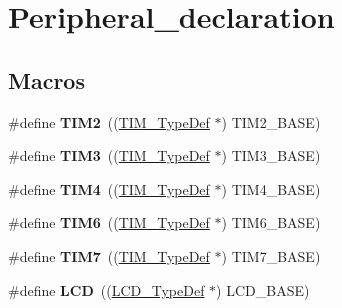 \hypertarget{group___peripheral__declaration}{\section{Peripheral\-\_\-declaration}
\label{group___peripheral__declaration}
}
\subsection*{Macros}
\begin{DoxyCompactItemize}
\item 
\hypertarget{group___peripheral__declaration_ga3cfac9f2e43673f790f8668d48b4b92b}{\#define {\bfseries T\-I\-M2}~((\hyperlink{struct_t_i_m___type_def}{T\-I\-M\-\_\-\-Type\-Def} $\ast$) T\-I\-M2\-\_\-\-B\-A\-S\-E)}\label{group___peripheral__declaration_ga3cfac9f2e43673f790f8668d48b4b92b}

\item 
\hypertarget{group___peripheral__declaration_ga61ee4c391385607d7af432b63905fcc9}{\#define {\bfseries T\-I\-M3}~((\hyperlink{struct_t_i_m___type_def}{T\-I\-M\-\_\-\-Type\-Def} $\ast$) T\-I\-M3\-\_\-\-B\-A\-S\-E)}\label{group___peripheral__declaration_ga61ee4c391385607d7af432b63905fcc9}

\item 
\hypertarget{group___peripheral__declaration_ga91a09bad8bdc7a1cb3d85cf49c94c8ec}{\#define {\bfseries T\-I\-M4}~((\hyperlink{struct_t_i_m___type_def}{T\-I\-M\-\_\-\-Type\-Def} $\ast$) T\-I\-M4\-\_\-\-B\-A\-S\-E)}\label{group___peripheral__declaration_ga91a09bad8bdc7a1cb3d85cf49c94c8ec}

\item 
\hypertarget{group___peripheral__declaration_gac7b4ed55f9201b498b38c962cca97314}{\#define {\bfseries T\-I\-M6}~((\hyperlink{struct_t_i_m___type_def}{T\-I\-M\-\_\-\-Type\-Def} $\ast$) T\-I\-M6\-\_\-\-B\-A\-S\-E)}\label{group___peripheral__declaration_gac7b4ed55f9201b498b38c962cca97314}

\item 
\hypertarget{group___peripheral__declaration_ga49267c49946fd61db6af8b49bcf16394}{\#define {\bfseries T\-I\-M7}~((\hyperlink{struct_t_i_m___type_def}{T\-I\-M\-\_\-\-Type\-Def} $\ast$) T\-I\-M7\-\_\-\-B\-A\-S\-E)}\label{group___peripheral__declaration_ga49267c49946fd61db6af8b49bcf16394}

\item 
\hypertarget{group___peripheral__declaration_gabf2d80992dcfabfd1668184c3dff2733}{\#define {\bfseries L\-C\-D}~((\hyperlink{struct_l_c_d___type_def}{L\-C\-D\-\_\-\-Type\-Def} $\ast$) L\-C\-D\-\_\-\-B\-A\-S\-E)}\label{group___peripheral__declaration_gabf2d80992dcfabfd1668184c3dff2733}


\end{DoxyCompactItemize}
